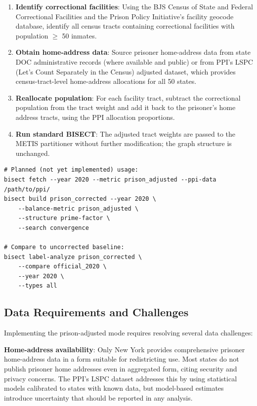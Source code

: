 \begin{enumerate}
    \item \textbf{Identify correctional facilities}: Using the BJS Census of State and Federal Correctional Facilities and the Prison Policy Initiative's facility geocode database, identify all census tracts containing correctional facilities with population $\geq$ 50 inmates.
    \item \textbf{Obtain home-address data}: Source prisoner home-address data from state DOC administrative records (where available and public) or from PPI's LSPC (Let's Count Separately in the Census) adjusted dataset, which provides census-tract-level home-address allocations for all 50 states.
    \item \textbf{Reallocate population}: For each facility tract, subtract the correctional population from the tract weight and add it back to the prisoner's home address tracts, using the PPI allocation proportions.
    \item \textbf{Run standard BISECT}: The adjusted tract weights are passed to the METIS partitioner without further modification; the graph structure is unchanged.
\end{enumerate}

\begin{verbatim}
# Planned (not yet implemented) usage:
bisect fetch --year 2020 --metric prison_adjusted --ppi-data /path/to/ppi/
bisect build prison_corrected --year 2020 \
    --balance-metric prison_adjusted \
    --structure prime-factor \
    --search convergence

# Compare to uncorrected baseline:
bisect label-analyze prison_corrected \
    --compare official_2020 \
    --year 2020 \
    --types all
\end{verbatim}

\subsection{Data Requirements and Challenges}

Implementing the prison-adjusted mode requires resolving several data challenges:

\textbf{Home-address availability}: Only New York provides comprehensive prisoner home-address data in a form suitable for redistricting use. Most states do not publish prisoner home addresses even in aggregated form, citing security and privacy concerns. The PPI's LSPC dataset addresses this by using statistical models calibrated to states with known data, but model-based estimates introduce uncertainty that should be reported in any analysis.

